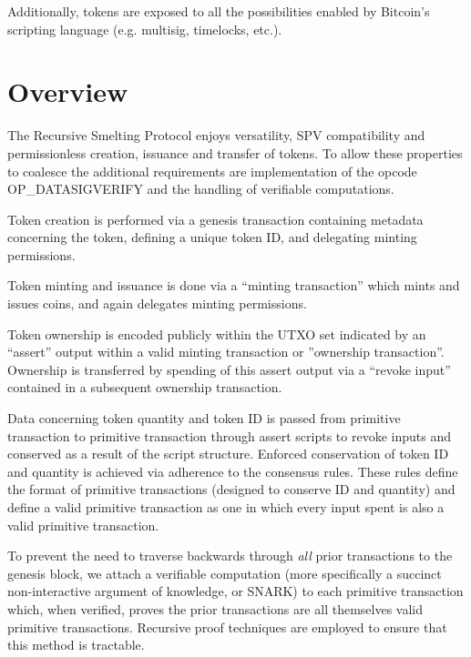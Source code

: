 \documentclass[9pt,oneside]{amsart}
\begin{document}
\begin{multicols}{2}
Additionally, tokens are exposed to all the possibilities enabled by Bitcoin's scripting language  (e.g. multisig, timelocks, etc.).

\section{Overview}
The Recursive Smelting Protocol enjoys versatility, SPV compatibility and permissionless creation, issuance and transfer of tokens. To allow these properties to coalesce the additional requirements are implementation of the opcode OP\_DATASIGVERIFY and the handling of verifiable computations.

Token creation is performed via a genesis transaction containing metadata concerning the token, defining a unique token ID, and delegating minting permissions.

Token minting and issuance is done via a ``minting transaction'' which mints and issues coins, and again delegates minting permissions.

Token ownership is encoded publicly within the UTXO set indicated by an ``assert'' output within a valid minting transaction or ''ownership transaction''. Ownership is transferred by spending of this assert output via a ``revoke input'' contained in a subsequent ownership transaction. 

Data concerning token quantity and token ID is passed from primitive transaction to primitive transaction through assert scripts to revoke inputs and conserved as a result of the script structure. Enforced conservation of token ID and quantity is achieved via adherence to the consensus rules. These rules define the format of primitive transactions (designed to conserve ID and quantity) and define a valid primitive transaction as one in which every input spent is also a valid primitive transaction.

To prevent the need to traverse backwards through \emph{all} prior transactions to the genesis block, we attach a verifiable computation (more specifically a succinct non-interactive argument of knowledge, or SNARK) to each primitive transaction which, when verified, proves the prior transactions are all themselves valid primitive transactions. Recursive proof techniques are employed to ensure that this method is tractable. 


\end{multicols}
\end{document}
